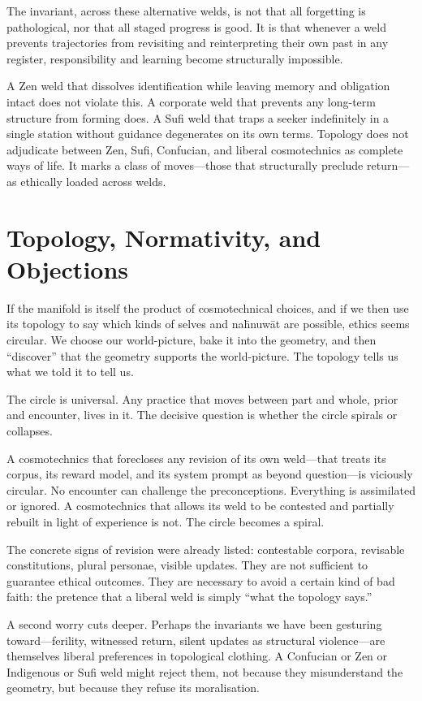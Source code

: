 The invariant, across these alternative welds, is not that all forgetting is pathological, nor that all staged progress is good. It is that whenever a weld prevents trajectories from revisiting and reinterpreting their own past in any register, responsibility and learning become structurally impossible.

A Zen weld that dissolves identification while leaving memory and obligation intact does not violate this. A corporate weld that prevents any long-term structure from forming does. A Sufi weld that traps a seeker indefinitely in a single station without guidance degenerates on its own terms. Topology does not adjudicate between Zen, Sufi, Confucian, and liberal cosmotechnics as complete ways of life. It marks a class of moves---those that structurally preclude return---as ethically loaded across welds.

\section{Topology, Normativity, and Objections}

If the manifold is itself the product of cosmotechnical choices, and if we then use its topology to say which kinds of selves and na\={h}nuw\={a}t are possible, ethics seems circular. We choose our world-picture, bake it into the geometry, and then ``discover'' that the geometry supports the world-picture. The topology tells us what we told it to tell us.

The circle is universal. Any practice that moves between part and whole, prior and encounter, lives in it. The decisive question is whether the circle spirals or collapses.

A cosmotechnics that forecloses any revision of its own weld---that treats its corpus, its reward model, and its system prompt as beyond question---is viciously circular. No encounter can challenge the preconceptions. Everything is assimilated or ignored. A cosmotechnics that allows its weld to be contested and partially rebuilt in light of experience is not. The circle becomes a spiral.

The concrete signs of revision were already listed: contestable corpora, revisable constitutions, plural personae, visible updates. They are not sufficient to guarantee ethical outcomes. They are necessary to avoid a certain kind of bad faith: the pretence that a liberal weld is simply ``what the topology says.''

A second worry cuts deeper. Perhaps the invariants we have been gesturing toward---ferility, witnessed return, silent updates as structural violence---are themselves liberal preferences in topological clothing. A Confucian or Zen or Indigenous or Sufi weld might reject them, not because they misunderstand the geometry, but because they refuse its moralisation.

